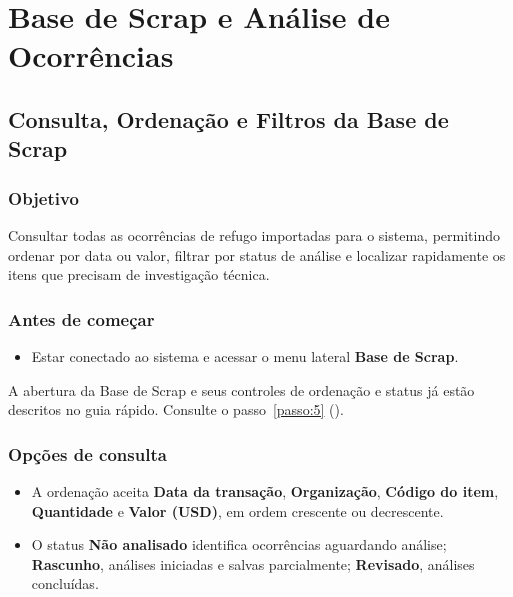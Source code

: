 \chapter{Base de Scrap e Análise de Ocorrências}

\label{cap:manual-4}

\section{Consulta, Ordenação e Filtros da Base de Scrap}

\subsection*{Objetivo}

Consultar todas as ocorrências de refugo importadas para o sistema, permitindo ordenar por data ou valor, filtrar por status de análise e localizar rapidamente os itens que precisam de investigação técnica.\par

\subsection*{Antes de começar}

\begin{itemize}
\item Estar conectado ao sistema e acessar o menu lateral \textbf{Base de Scrap}.
\end{itemize}

\begin{remark}[info]
A abertura da Base de Scrap e seus controles de ordenação e status já estão descritos no guia rápido. Consulte o passo~\ref{passo:5} ().
\end{remark}
\subsection*{Opções de consulta}
\begin{itemize}
\item A ordenação aceita \textbf{Data da transação}, \textbf{Organização}, \textbf{Código do item}, \textbf{Quantidade} e \textbf{Valor (USD)}, em ordem crescente ou decrescente.
\item O status \textbf{Não analisado} identifica ocorrências aguardando análise; \textbf{Rascunho}, análises iniciadas e salvas parcialmente; \textbf{Revisado}, análises concluídas.
\end{itemize}


